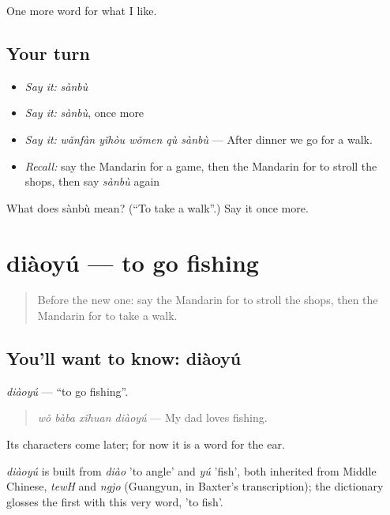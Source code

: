 \begin{grammarlens}[title={What you've built}]
One more word for what I like.
\end{grammarlens}

\subsection*{Your turn}
\begin{itemize}
\raggedright
  \item \emph{Say it:} \emph{sànbù}
  \item \emph{Say it:} \emph{sànbù}, once more
  \item \emph{Say it:} \emph{wǎnfàn yǐhòu wǒmen qù sànbù} — After dinner we go for a walk.
  \item \emph{Recall:} say the Mandarin for a game, then the Mandarin for to stroll the shops, then say \emph{sànbù} again
\end{itemize}

\begin{tcolorbox}[breakable,colback=teal!4,colframe=teal!35!black,title={Before you move on}]
What does sànbù mean? (\textquotedblleft{}To take a walk\textquotedblright{}.) Say it once more.
\end{tcolorbox}
\section[diàoyú]{diàoyú — to go fishing}

\label{lesson:ZH-C141-diaoyu}



\begin{quote}
Before the new one: say the Mandarin for to stroll the shops, then the Mandarin for to take a walk.
\end{quote}

\subsection*{You'll want to know: diàoyú}
\emph{diàoyú} — \textquotedblleft{}to go fishing\textquotedblright{}.

\begin{quote}
\emph{wǒ bàba xǐhuan diàoyú} — My dad loves fishing.
\end{quote}

Its characters come later; for now it is a word for the ear.

\begin{cousinweb}
\emph{diàoyú} is built from \emph{diào} 'to angle' and \emph{yú} 'fish', both inherited from Middle Chinese, \emph{tewH} and \emph{ngjo} (Guangyun, in Baxter's transcription); the dictionary glosses the first with this very word, 'to fish'.
\end{cousinweb}

